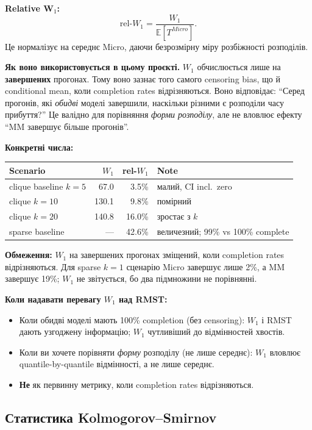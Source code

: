 \documentclass[11pt,a4paper]{article}
\begin{document}
\textbf{Relative W$_1$:}
\[
  \mathrm{rel}\text{-}W_1 = \frac{W_1}{\mathbb{E}[T^{Micro}]}.
\]
Це нормалізує на середнє Micro, даючи безрозмірну міру
розбіжності розподілів.

\textbf{Як воно використовується в цьому проєкті.}
$W_1$ обчислюється лише на \textbf{завершених} прогонах.  Тому воно зазнає
того самого censoring bias, що й conditional mean, коли completion rates
відрізняються.  Воно відповідає: ``Серед прогонів, які \emph{обидві} моделі
завершили, наскільки різними є розподіли часу прибуття?''  Це валідно для
порівняння \emph{форми розподілу}, але не вловлює
ефекту ``MM завершує більше прогонів''.

\textbf{Конкретні числа:}
\begin{center}
\begin{tabular}{lrrl}
\toprule
Scenario & $W_1$ & rel-$W_1$ & Note \\
\midrule
clique baseline $k=5$ & 67.0 & 3.5\% & малий, CI incl.\ zero \\
clique $k=10$         & 130.1 & 9.8\% & помірний \\
clique $k=20$         & 140.8 & 16.0\% & зростає з $k$ \\
sparse baseline       & ---  & 42.6\% & величезний; 99\% vs 100\% complete \\
\bottomrule
\end{tabular}
\end{center}

\textbf{Обмеження:} $W_1$ на завершених прогонах зміщений, коли completion rates
відрізняються.  Для sparse $k=1$ сценарію Micro завершує лише 2\%, а MM
завершує 19\%; $W_1$ не звітується, бо два підмножини не
порівнянні.

\textbf{Коли надавати перевагу $W_1$ над RMST:}
\begin{itemize}
  \item Коли обидві моделі мають 100\% completion (без censoring): $W_1$ і RMST
        дають узгоджену інформацію; $W_1$ чутливіший до відмінностей хвостів.
  \item Коли ви хочете порівняти \emph{форму} розподілу (не лише середнє):
        $W_1$ вловлює quantile-by-quantile відмінності, а не лише середнє.
  \item \textbf{Не} як первинну метрику, коли completion rates відрізняються.
\end{itemize}

\subsection{Статистика Kolmogorov--Smirnov}
\end{document}

